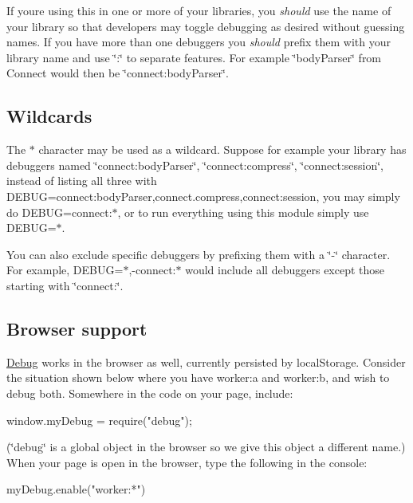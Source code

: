 If you\textquotesingle{}re using this in one or more of your libraries, you {\itshape should} use the name of your library so that developers may toggle debugging as desired without guessing names. If you have more than one debuggers you {\itshape should} prefix them with your library name and use \char`\"{}\+:\char`\"{} to separate features. For example \char`\"{}body\+Parser\char`\"{} from Connect would then be \char`\"{}connect\+:body\+Parser\char`\"{}.

\subsection*{Wildcards}

The {\ttfamily $\ast$} character may be used as a wildcard. Suppose for example your library has debuggers named \char`\"{}connect\+:body\+Parser\char`\"{}, \char`\"{}connect\+:compress\char`\"{}, \char`\"{}connect\+:session\char`\"{}, instead of listing all three with {\ttfamily D\+E\+B\+U\+G=connect\+:body\+Parser,connect.\+compress,connect\+:session}, you may simply do {\ttfamily D\+E\+B\+U\+G=connect\+:$\ast$}, or to run everything using this module simply use {\ttfamily D\+E\+B\+U\+G=$\ast$}.

You can also exclude specific debuggers by prefixing them with a \char`\"{}-\/\char`\"{} character. For example, {\ttfamily D\+E\+B\+U\+G=$\ast$,-\/connect\+:$\ast$} would include all debuggers except those starting with \char`\"{}connect\+:\char`\"{}.

\subsection*{Browser support}

\hyperlink{class_debug}{Debug} works in the browser as well, currently persisted by {\ttfamily local\+Storage}. Consider the situation shown below where you have {\ttfamily worker\+:a} and {\ttfamily worker\+:b}, and wish to debug both. Somewhere in the code on your page, include\+:


\begin{DoxyCode}
window.myDebug = require(\textcolor{stringliteral}{"debug"});
\end{DoxyCode}


(\char`\"{}debug\char`\"{} is a global object in the browser so we give this object a different name.) When your page is open in the browser, type the following in the console\+:


\begin{DoxyCode}
myDebug.enable(\textcolor{stringliteral}{"worker:*"})
\end{DoxyCode}


